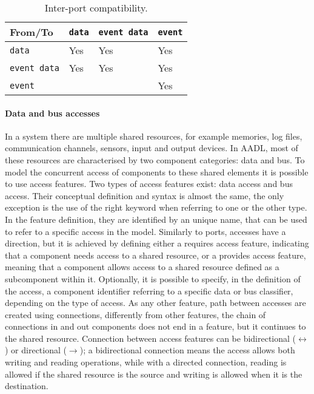 \begin{table}
    \myfloatalign
    \begin{tabularx}{\textwidth}{X | X | X | X}
        \toprule
        From/To  & \texttt{data} & \texttt{event data} & \texttt{event}   \\
        \midrule
        \texttt{data}  & Yes & Yes & Yes   \\
        \texttt{event data}  & Yes & Yes & Yes   \\
        \texttt{event}  &  &  & Yes   \\
        \bottomrule
    \end{tabularx}
    \caption[Inter-port compatibility]{Inter-port compatibility.}  \label{tab:ports}
\end{table}

\paragraph{Data and bus accesses}
In a system there are multiple shared resources, for example memories, log files, communication channels, sensors, input and output devices. In AADL, most of these resources are characterised by two component categories: data and bus. To model the concurrent access of components to these shared elements it is possible to use access features. Two types of access features exist: data access and bus access. Their conceptual definition and syntax is almost the same, the only exception is the use of the right keyword when referring to one or the other type. In the feature definition, they are identified by an unique name, that can be used to refer to a specific access in the model. Similarly to ports, accesses have a direction, but it is achieved by defining either  a requires access feature, indicating that a component needs access to a shared resource, or a provides access feature, meaning that a component allows access to a shared resource defined as a subcomponent within it. Optionally, it is possible to specify, in the definition of the access, a component identifier referring to a specific data or bus classifier, depending on the type of access. As any other feature, path between accesses are created using connections, differently from other features, the chain of connections in and out components does not end in a feature, but it continues to the shared resource. Connection between access features can be bidirectional ($\leftrightarrow$) or directional ($\rightarrow$); a bidirectional connection means the access allows both writing and reading operations, while with a directed connection, reading is allowed if the shared resource is the source and writing is allowed when it is the destination.

